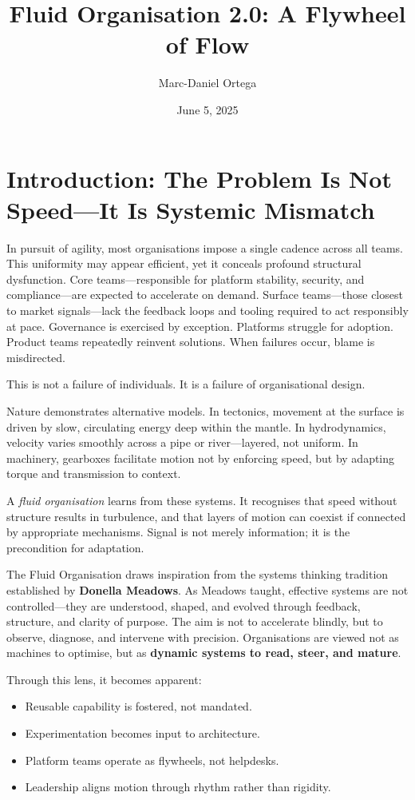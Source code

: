 \documentclass[12pt]{article}
\title{Fluid Organisation 2.0: A Flywheel of Flow}
\author{Marc-Daniel Ortega}
\date{June 5, 2025}
\begin{document}
\maketitle
\tableofcontents
\newpage

\section{Introduction: The Problem Is Not Speed—It Is Systemic Mismatch}

In pursuit of agility, most organisations impose a single cadence across all teams. This uniformity may appear efficient, yet it conceals profound structural dysfunction. Core teams—responsible for platform stability, security, and compliance—are expected to accelerate on demand. Surface teams—those closest to market signals—lack the feedback loops and tooling required to act responsibly at pace. Governance is exercised by exception. Platforms struggle for adoption. Product teams repeatedly reinvent solutions. When failures occur, blame is misdirected.

This is not a failure of individuals. It is a failure of organisational design.

Nature demonstrates alternative models. In tectonics, movement at the surface is driven by slow, circulating energy deep within the mantle. In hydrodynamics, velocity varies smoothly across a pipe or river—layered, not uniform. In machinery, gearboxes facilitate motion not by enforcing speed, but by adapting torque and transmission to context.

A \textit{fluid organisation} learns from these systems. It recognises that speed without structure results in turbulence, and that layers of motion can coexist if connected by appropriate mechanisms. Signal is not merely information; it is the precondition for adaptation.

The Fluid Organisation draws inspiration from the systems thinking tradition established by \textbf{Donella Meadows}. As Meadows taught, effective systems are not controlled—they are understood, shaped, and evolved through feedback, structure, and clarity of purpose. The aim is not to accelerate blindly, but to observe, diagnose, and intervene with precision. Organisations are viewed not as machines to optimise, but as \textbf{dynamic systems to read, steer, and mature}.

Through this lens, it becomes apparent:
\begin{itemize}
    \item Reusable capability is fostered, not mandated.
    \item Experimentation becomes input to architecture.
    \item Platform teams operate as flywheels, not helpdesks.
    \item Leadership aligns motion through rhythm rather than rigidity.
\end{itemize}
\end{document}
